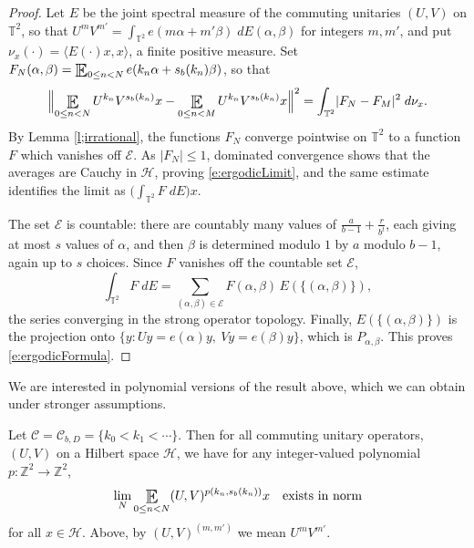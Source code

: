 \begin{proof}
Let $E$ be the joint spectral measure of the commuting unitaries $(U,V)$ on $\mathbb T ^2 $, so that $U^mV^{m'}=\int_{\mathbb T ^2 }e(m\alpha +m'\beta )\;dE(\alpha ,\beta )$ 
for integers $m,m'$, and put $\nu_x(\cdot )=\langle E(\cdot )x,x\rangle$, a finite positive measure. 
Set $F_N(\alpha ,\beta )=\Expectation_{0\leq n<N}e(k_n\alpha +s_b(k_n)\beta )$, so that 
\begin{equation}
\Bigl\lVert \Expectation_{0\leq n<N} U^{k_n}V^{s_b(k_n)}x - \Expectation_{0\leq n<M} U^{k_n}V^{s_b(k_n)}x \Bigr\rVert ^2 
= \int_{\mathbb T ^2 } \lvert F_N - F_M\rvert ^2 \; d \nu_x . 
\end{equation}
By Lemma \ref{l;irrational}, the functions $F_N$ converge pointwise on $\mathbb T ^2 $ to a function $F$ which vanishes off $\mathcal E$. 
As $\lvert F_N\rvert \leq 1$, dominated convergence shows that the averages are Cauchy in $\mathcal H$, proving \eqref{e:ergodicLimit}, 
and the same estimate identifies the limit as $\bigl(\int_{\mathbb T ^2 }F\;dE\bigr)x$. 

The set $\mathcal E$ is countable: there are countably many values of $\frac{a}{b-1}+\frac{r}{b^t}$, each giving at most $s$ values of $\alpha$, 
and then $\beta$ is determined modulo $1$ by $a$ modulo $b-1$, again up to $s$ choices. 
Since $F$ vanishes off the countable set $\mathcal E$, 
\begin{equation}
\int_{\mathbb T ^2 } F \; dE = \sum_{(\alpha ,\beta )\in \mathcal E} F(\alpha ,\beta )\, E(\{(\alpha ,\beta )\}) , 
\end{equation}
the series converging in the strong operator topology. 
Finally, $E(\{(\alpha ,\beta )\})$ is the projection onto $\{y\colon Uy=e(\alpha )y,\ Vy=e(\beta )y\}$, which is $P_{\alpha ,\beta }$. 
This proves \eqref{e:ergodicFormula}. 
\end{proof}

We are interested in polynomial versions of the result above, which we can obtain under stronger  assumptions. 



\begin{theorem} \label{t:polyMeanErgodic}
Let $\mathcal C = \mathcal C _{b,D}=\{k_0<k_1<\cdots\}$.  Then for all commuting unitary operators, $(U,V)$ on a Hilbert space $\mathcal H$, we have for any integer-valued polynomial $p \colon \mathbb{Z} ^2  \to \mathbb{Z} ^2 $, 
\begin{equation}
  \lim_N  \Expectation_{0\leq n<N}(U,V) ^{p (k_n, s_b(k_n))}  x  
  \quad \textup{exists in norm} 
 \end{equation}
for all $x\in \mathcal H$. 
Above, by $(U,V) ^{(m,m')}$ we mean $U ^{m}V ^{m'}$.  
\end{theorem}

